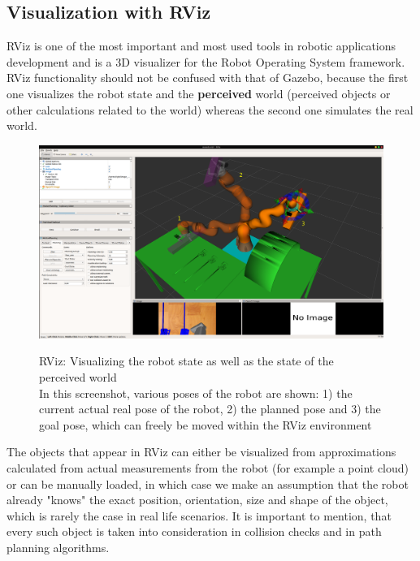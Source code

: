 \subsection{Visualization with RViz}

RViz is one of the most important and most used tools in robotic applications development and is a 3D visualizer for the Robot Operating System framework. RViz functionality should not be confused 
with that of Gazebo, because the first one visualizes the robot state and the \textbf{perceived} world (perceived objects or other calculations related to the world) whereas the second one simulates the real world.

\begin{center}
\begin{figure}[H]
\centering
\includegraphics[width=\textwidth]{images/rviz.png}\\
\caption{RViz: Visualizing the robot state as well as the state of the perceived world\\
In this screenshot, various poses of the robot are shown: 1) the current actual real pose of the robot, 2) the planned pose and 3) the goal pose, which can 
freely be moved within the RViz environment}
\end{figure}
\end{center}

The objects that appear in RViz can either be visualized from approximations calculated from actual measurements from the robot (for example a point cloud) or can be manually loaded, in which case we make 
an assumption that the robot already "knows" the exact position, orientation, size and shape of the object, which is rarely the case in real life scenarios.
It is important to mention, that every such object is taken into consideration in collision checks and in path planning algorithms.

